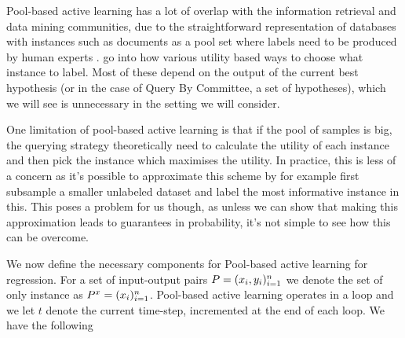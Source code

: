 Pool-based active learning has a lot of overlap with the information retrieval
and data mining communities, due to the straightforward representation of
databases with instances such as documents as a pool set where labels need to be
produced by human experts
\cite{lewis94,tong01_suppor_vector_machin_activ_learn}. \cite{settles08} go into
how various utility based ways to choose what instance to label. Most of these
depend on the output of the current best hypothesis (or in the case of Query By
Committee, a set of hypotheses), which we will see is unnecessary in the setting
we will consider.

One limitation of pool-based active learning is that if the pool of samples is
big, the querying strategy theoretically need to calculate the utility of each
instance and then pick the instance which maximises the utility. In practice,
this is less of a concern as it's possible to approximate this scheme by for
example first subsample a smaller unlabeled dataset and label the most
informative instance in this. This poses a problem for us though, as unless we
can show that making this approximation leads to guarantees in probability, it's
not simple to see how this can be overcome.

We now define the necessary components for Pool-based active learning for
regression. For a set of input-output pairs \(P = (x_{i},
y_{i})_{i=1}^{n}\) we denote the set of only instance as \(P^x =
(x_{i})_{i=1}^{n}\). Pool-based active learning operates in a loop and we let
\(t\) denote the current time-step, incremented at the end of each loop. We have
the following

